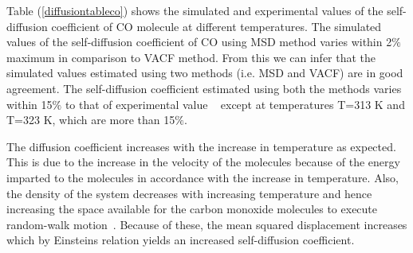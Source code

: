  
 \begin{table}[H]
   \centering
   \caption[The simulated value and the experimental value of Self-Diffusion coefficient of CO
   molecule. ]{The simulated value and the experimental value of Self-Diffusion coefficient of CO  molecule as a  function of temperature are listed.}
  \label{diffusiontableco}
 \end{table} 
 
 Table (\ref{diffusiontableco}) shows the simulated and experimental values of the self-diffusion coefficient of CO molecule at different temperatures. The simulated values of the  self-diffusion coefficient of CO using MSD method varies within 2$\%$ maximum
 in comparison to VACF method. From this we can infer that the simulated values estimated using two methods (i.e. MSD and VACF) are in good agreement. The self-diffusion coefficient estimated using both the methods varies within  15$\%$ to that of experimental value ~\citep{wise1968diffusion} except at temperatures T=313 K and T=323 K, which are more than 15$\%$. 
 
 The diffusion coefficient increases with the increase in temperature as expected.
 This is due to the increase in the velocity of the molecules because of the energy imparted to the molecules in accordance with the increase in temperature.  Also, the density of the system decreases with increasing temperature and hence increasing the space available for the carbon monoxide molecules to execute random-walk motion~\citep{Thapa2013}. Because of these, the mean squared displacement increases which by Einsteins relation yields an increased self-diffusion coefficient.
 
